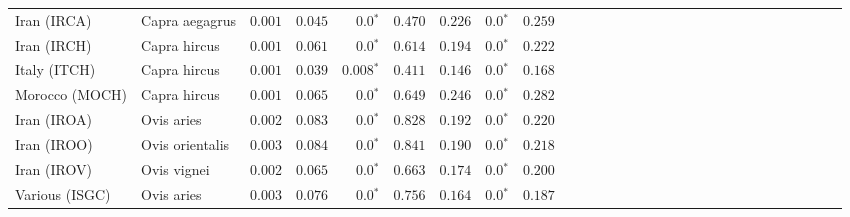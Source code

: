 \begin{center}
\begin{adjustbox}{width = 1\textwidth}
\begin{tabular}{|l|l|r|r|r|r|r|r|r|r|r|r|r|r|r|r|r|r|r|r|r|r|r|r|r|r|r|r|r|}
                    Iran (IRCA) &       Capra aegagrus &           $ 0.001$ &                      $ 0.045$ &                  $\bm{0.0{^*}}$ &                                           $ 0.470$ &                      $ 0.226$ &                  $\bm{0.0{^*}}$ &                                           $ 0.259$ \\
                    Iran (IRCH) &         Capra hircus &           $ 0.001$ &                      $ 0.061$ &                  $\bm{0.0{^*}}$ &                                           $ 0.614$ &                      $ 0.194$ &                  $\bm{0.0{^*}}$ &                                           $ 0.222$ \\
                   Italy (ITCH) &         Capra hircus &           $ 0.001$ &                      $ 0.039$ &               $\bm{ 0.008{^*}}$ &                                           $ 0.411$ &                      $ 0.146$ &                  $\bm{0.0{^*}}$ &                                           $ 0.168$ \\
                 Morocco (MOCH) &         Capra hircus &           $ 0.001$ &                      $ 0.065$ &                  $\bm{0.0{^*}}$ &                                           $ 0.649$ &                      $ 0.246$ &                  $\bm{0.0{^*}}$ &                                           $ 0.282$ \\
                    Iran (IROA) &           Ovis aries &           $ 0.002$ &                      $ 0.083$ &                  $\bm{0.0{^*}}$ &                                           $ 0.828$ &                      $ 0.192$ &                  $\bm{0.0{^*}}$ &                                           $ 0.220$ \\
                    Iran (IROO) &      Ovis orientalis &           $ 0.003$ &                      $ 0.084$ &                  $\bm{0.0{^*}}$ &                                           $ 0.841$ &                      $ 0.190$ &                  $\bm{0.0{^*}}$ &                                           $ 0.218$ \\
                    Iran (IROV) &          Ovis vignei &           $ 0.002$ &                      $ 0.065$ &                  $\bm{0.0{^*}}$ &                                           $ 0.663$ &                      $ 0.174$ &                  $\bm{0.0{^*}}$ &                                           $ 0.200$ \\
                 Various (ISGC) &           Ovis aries &           $ 0.003$ &                      $ 0.076$ &                  $\bm{0.0{^*}}$ &                                           $ 0.756$ &                      $ 0.164$ &                  $\bm{0.0{^*}}$ &                                           $ 0.187$ \\

\end{tabular}
\end{adjustbox}
\end{center}
